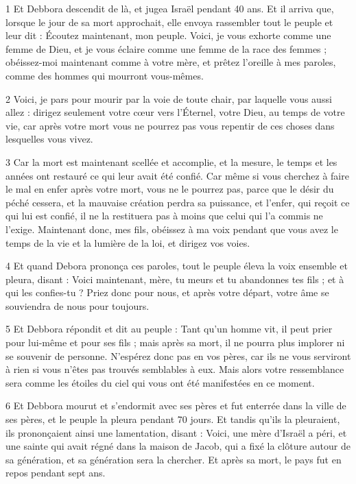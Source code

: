 
\par 1 Et Debbora descendit de là, et jugea Israël pendant 40 ans. Et il arriva que, lorsque le jour de sa mort approchait, elle envoya rassembler tout le peuple et leur dit : Écoutez maintenant, mon peuple. Voici, je vous exhorte comme une femme de Dieu, et je vous éclaire comme une femme de la race des femmes ; obéissez-moi maintenant comme à votre mère, et prêtez l'oreille à mes paroles, comme des hommes qui mourront vous-mêmes.

\par 2 Voici, je pars pour mourir par la voie de toute chair, par laquelle vous aussi allez : dirigez seulement votre cœur vers l'Éternel, votre Dieu, au temps de votre vie, car après votre mort vous ne pourrez pas vous repentir de ces choses dans lesquelles vous vivez.

\par 3 Car la mort est maintenant scellée et accomplie, et la mesure, le temps et les années ont restauré ce qui leur avait été confié. Car même si vous cherchez à faire le mal en enfer après votre mort, vous ne le pourrez pas, parce que le désir du péché cessera, et la mauvaise création perdra sa puissance, et l'enfer, qui reçoit ce qui lui est confié, il ne la restituera pas à moins que celui qui l'a commis ne l'exige. Maintenant donc, mes fils, obéissez à ma voix pendant que vous avez le temps de la vie et la lumière de la loi, et dirigez vos voies.

\par 4 Et quand Debora prononça ces paroles, tout le peuple éleva la voix ensemble et pleura, disant : Voici maintenant, mère, tu meurs et tu abandonnes tes fils ; et à qui les confies-tu ? Priez donc pour nous, et après votre départ, votre âme se souviendra de nous pour toujours.

\par 5 Et Debbora répondit et dit au peuple : Tant qu'un homme vit, il peut prier pour lui-même et pour ses fils ; mais après sa mort, il ne pourra plus implorer ni se souvenir de personne. N’espérez donc pas en vos pères, car ils ne vous serviront à rien si vous n’êtes pas trouvés semblables à eux. Mais alors votre ressemblance sera comme les étoiles du ciel qui vous ont été manifestées en ce moment.

\par 6 Et Debbora mourut et s'endormit avec ses pères et fut enterrée dans la ville de ses pères, et le peuple la pleura pendant 70 jours. Et tandis qu'ils la pleuraient, ils prononçaient ainsi une lamentation, disant : Voici, une mère d'Israël a péri, et une sainte qui avait régné dans la maison de Jacob, qui a fixé la clôture autour de sa génération, et sa génération sera la chercher. Et après sa mort, le pays fut en repos pendant sept ans.

